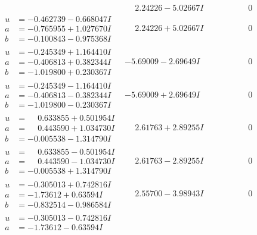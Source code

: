 \documentclass[1p]{elsarticle_modified}
\theoremstyle{definition}
\begin{document}
$$\begin{array}{c|c|c}
 & \phantom{-}2.24226 - 5.02667 I & \phantom{-0.000000 } 0 \\ \hline\begin{aligned}
u &= -0.462739 - 0.668047 I \\
a &= -0.765955 + 1.027670 I \\
b &= -0.100843 - 0.975368 I\end{aligned}
 & \phantom{-}2.24226 + 5.02667 I & \phantom{-0.000000 } 0 \\ \hline\begin{aligned}
u &= -0.245349 + 1.164410 I \\
a &= -0.406813 + 0.382344 I \\
b &= -1.019800 + 0.230367 I\end{aligned}
 & -5.69009 - 2.69649 I & \phantom{-0.000000 } 0 \\ \hline\begin{aligned}
u &= -0.245349 - 1.164410 I \\
a &= -0.406813 - 0.382344 I \\
b &= -1.019800 - 0.230367 I\end{aligned}
 & -5.69009 + 2.69649 I & \phantom{-0.000000 } 0 \\ \hline\begin{aligned}
u &= \phantom{-}0.633855 + 0.501954 I \\
a &= \phantom{-}0.443590 + 1.034730 I \\
b &= -0.005538 - 1.314790 I\end{aligned}
 & \phantom{-}2.61763 + 2.89255 I & \phantom{-0.000000 } 0 \\ \hline\begin{aligned}
u &= \phantom{-}0.633855 - 0.501954 I \\
a &= \phantom{-}0.443590 - 1.034730 I \\
b &= -0.005538 + 1.314790 I\end{aligned}
 & \phantom{-}2.61763 - 2.89255 I & \phantom{-0.000000 } 0 \\ \hline\begin{aligned}
u &= -0.305013 + 0.742816 I \\
a &= -1.73612 + 0.63594 I \\
b &= -0.832514 - 0.986584 I\end{aligned}
 & \phantom{-}2.55700 - 3.98943 I & \phantom{-0.000000 } 0 \\ \hline\begin{aligned}
u &= -0.305013 - 0.742816 I \\
a &= -1.73612 - 0.63594 I \\

\end{aligned}
\end{array}$$
\end{document}
